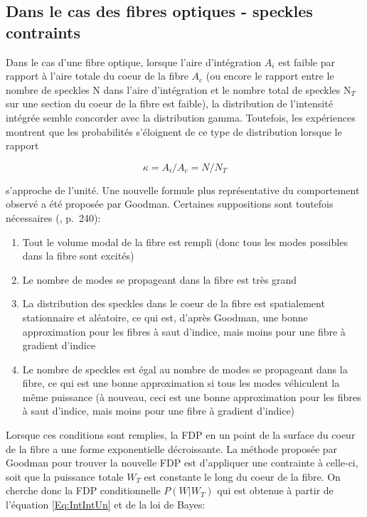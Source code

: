 \documentclass{article}       %
\begin{document}
\subsection{Dans le cas des fibres optiques - speckles contraints}
\label{Sec:SpeckCons}

Dans le cas d'une fibre optique, lorsque l'aire d'intégration $A_i$ est faible par rapport à l'aire totale du coeur de la fibre $A_c$ (ou encore le rapport entre le nombre de speckles N dans l'aire d'intégration et le nombre total de speckles N$_T$ sur une section du coeur de la fibre est faible), la distribution de l'intensité intégrée semble concorder avec la distribution gamma. Toutefois, les expériences montrent que les probabilités s'éloignent de ce type de distribution lorsque le rapport

\begin{equation}
    \kappa = A_{i}/A_{c} = N/N_{T}
\end{equation}

s'approche de l'unité. Une nouvelle formule plus représentative du comportement observé a été proposée par Goodman. Certaines suppositions sont toutefois nécessaires (\cite{Manuel}, p.~240):\\
\begin{enumerate}
    \item Tout le volume modal de la fibre est rempli (donc tous les modes possibles dans la fibre sont excités)
    
    \item Le nombre de modes se propageant dans la fibre est très grand
    
    \item La distribution des speckles dans le coeur de la fibre est spatialement stationnaire et aléatoire, ce qui est, d'après Goodman, une bonne approximation pour les fibres à saut d'indice, mais moins pour une fibre à gradient d'indice
    
    \item Le nombre de speckles est égal au nombre de modes se propageant dans la fibre, ce qui est une bonne approximation si tous les modes véhiculent la même puissance (à nouveau, ceci est une bonne approximation pour les fibres à saut d'indice, mais moins pour une fibre à gradient d'indice)
\end{enumerate}

\bigskip

Lorsque ces conditions sont remplies, la FDP en un point de la surface du coeur de la fibre a une forme exponentielle décroissante. La méthode proposée par Goodman pour trouver la nouvelle FDP est d'appliquer une contrainte à celle-ci, soit que la puissance totale $W_T$ est constante le long du coeur de la fibre. On cherche donc la FDP conditionnelle $P(W|W_T)$ qui est obtenue à partir de l'équation \ref{Eq:IntIntUn} et de la loi de Bayes:
\end{document}
